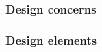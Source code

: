 			\subsubsection{Design concerns} \label{s:template-vpv:design-concerns}
				\begin{comment}
					The purpose of the Context viewpoint is to identify a design subject’s offered services, its actors (users and
					other interacting stakeholders), to establish the system boundary and to effectively delineate the design
					subject’s scope of use and operation.
					Drawing a boundary separating a design subject from its environment, determining a set of services to be
					provided, and the information flows between design subject and its environment, is typically a key design
					decision. That makes this viewpoint applicable to most design efforts.
					When the system is portrayed as a black box, with internal decisions hidden, the Context view is often a
					starting point of design, showing what is to be designed functionally as the only available information
					about the design subject: a name and an associated set of externally identifiable services. Requirements
					analysis identifies these services with the specification of quality of service attributes, henceforth invoking
					many non-functional requirements. Frequently incomplete, a Context view is begun in requirements
					analysis. Work to complete this view continues during design.
				\end{comment}
				
			\subsubsection{Design elements} \label{s:template-vpv:design-elements}
				\begin{comment}
					Design entities: actors—external active elements interacting with the design subject, including users, other
					stakeholders and external systems, or other items; services—also called use cases; and directed information
					flows between the design subject, treated as a black box, and its actors associating actors with services.
					Flows capture the expected information content exchanged.
					Design relationships: receive output and provide input (between actors and the design subject).
					Design constraints: qualities of service; form and medium of interaction (provided to and received from)
					with environment.
				\end{comment}
				
